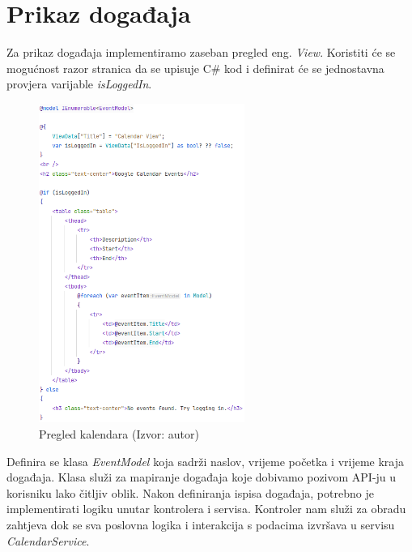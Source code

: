 \documentclass{foi}
\begin{document}
\section{Prikaz događaja}
Za prikaz događaja implementiramo zaseban pregled {eng. \textit{View}}. Koristiti će se mogućnost razor stranica da se upisuje C\# kod i definirat će se jednostavna provjera varijable \textit{isLoggedIn}. 
\begin{figure}[H]
    \centering
    \includegraphics[width=0.6\textwidth]{slike/calendarView.png}
    \caption{Pregled kalendara (Izvor: autor)}
    \label{fig:calendarView}

\end{figure}
Definira se klasa \textit{EventModel} koja sadrži naslov, vrijeme početka i vrijeme kraja događaja. Klasa služi za mapiranje događaja koje dobivamo pozivom API-ju u korisniku lako čitljiv oblik. 
Nakon definiranja ispisa događaja, potrebno je implementirati logiku unutar kontrolera i servisa. Kontroler nam služi za obradu zahtjeva dok se sva poslovna logika i interakcija s podacima izvršava u servisu {\textit{CalendarService}}.
\end{document}
